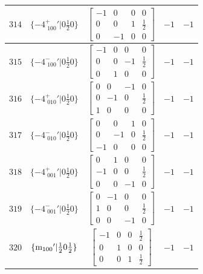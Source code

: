 \documentclass[fleqn,8pt]{jsarticle}
\begin{document}
\begin{longtable}{ccccc}
$ 314 $ & $ \{-4^{+}_{\,\,100}{}'|0 \frac{1}{2} 0\} $ & $ \begin{bmatrix} -1 & 0 & 0 & 0 \\ 0 & 0 & 1 & \frac{1}{2} \\ 0 & -1 & 0 & 0 \end{bmatrix} $ & $ -1 $ & $ -1 $ \\ \hline
$ 315 $ & $ \{-4^{-}_{\,\,100}{}'|0 \frac{1}{2} 0\} $ & $ \begin{bmatrix} -1 & 0 & 0 & 0 \\ 0 & 0 & -1 & \frac{1}{2} \\ 0 & 1 & 0 & 0 \end{bmatrix} $ & $ -1 $ & $ -1 $ \\ \hline
$ 316 $ & $ \{-4^{+}_{\,\,010}{}'|0 \frac{1}{2} 0\} $ & $ \begin{bmatrix} 0 & 0 & -1 & 0 \\ 0 & -1 & 0 & \frac{1}{2} \\ 1 & 0 & 0 & 0 \end{bmatrix} $ & $ -1 $ & $ -1 $ \\ \hline
$ 317 $ & $ \{-4^{-}_{\,\,010}{}'|0 \frac{1}{2} 0\} $ & $ \begin{bmatrix} 0 & 0 & 1 & 0 \\ 0 & -1 & 0 & \frac{1}{2} \\ -1 & 0 & 0 & 0 \end{bmatrix} $ & $ -1 $ & $ -1 $ \\ \hline
$ 318 $ & $ \{-4^{+}_{\,\,001}{}'|0 \frac{1}{2} 0\} $ & $ \begin{bmatrix} 0 & 1 & 0 & 0 \\ -1 & 0 & 0 & \frac{1}{2} \\ 0 & 0 & -1 & 0 \end{bmatrix} $ & $ -1 $ & $ -1 $ \\ \hline
$ 319 $ & $ \{-4^{-}_{\,\,001}{}'|0 \frac{1}{2} 0\} $ & $ \begin{bmatrix} 0 & -1 & 0 & 0 \\ 1 & 0 & 0 & \frac{1}{2} \\ 0 & 0 & -1 & 0 \end{bmatrix} $ & $ -1 $ & $ -1 $ \\ \hline
$ 320 $ & $ \{{\rm m}_{100}{}'|\frac{1}{2} 0 \frac{1}{2}\} $ & $ \begin{bmatrix} -1 & 0 & 0 & \frac{1}{2} \\ 0 & 1 & 0 & 0 \\ 0 & 0 & 1 & \frac{1}{2} \end{bmatrix} $ & $ -1 $ & $ -1 $ \\ \hline

\end{longtable}
\end{document}
